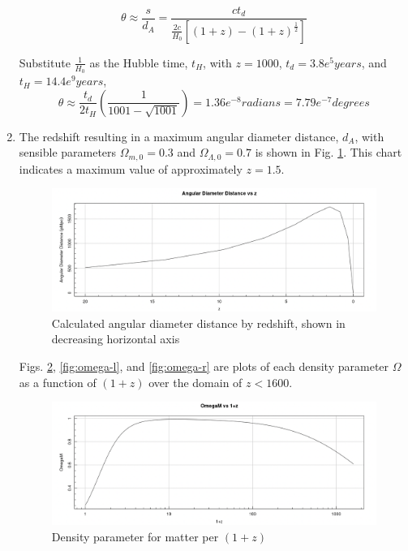 \documentclass{paper}
\begin{document}
\begin{enumerate}
      \[
        \theta \approx \frac{s}{d_A} = \frac{ct_d}
        {\frac{2c}{H_0}\left[(1+z)-(1+z)^\frac{1}{2}\right]}
      \]

      Substitute \(\frac{1}{H_0}\) as the Hubble time, \(t_H\), with
      \(z = 1000\), \(t_d = 3.8e^5 \si{years}\), and 
      \(t_H = 14.4e^9 \si{years}\),
      \[
        \theta \approx \frac{t_d}{2t_H}\left(\frac{1}{1001-\sqrt{1001}}\right)
        = 1.36e^{-8} \si{radians} = 7.79e^{-7} \si{degrees}
      \]

    \item %
      The redshift resulting in a maximum angular diameter distance,
      \(d_A\), with sensible parameters \(\Omega_{m,0} = 0.3\) and
      \(\Omega_{\Lambda,0} = 0.7\) is shown in Fig. 
      \ref{fig:angular-diameter-distance}. This chart indicates a maximum
      value of approximately \(z = 1.5\).
      \begin{figure}[H]
        \includegraphics[width=\linewidth]{angular-diameter-distance.png}
        \caption{Calculated angular diameter distance by redshift, shown
        in decreasing horizontal axis}
        \label{fig:angular-diameter-distance}
      \end{figure}

      Figs. \ref{fig:omega-m}, \ref{fig:omega-l}, and \ref{fig:omega-r} 
      are plots of each density parameter \(\Omega\) as a function of 
      \((1+z)\) over the domain of \(z < 1600\).

      \begin{figure}[H]
        \includegraphics[width=\linewidth]{omega-m.png}
        \caption{Density parameter for matter per \((1+z)\)}
        \label{fig:omega-m}
      \end{figure}


\end{enumerate}
\end{document}
